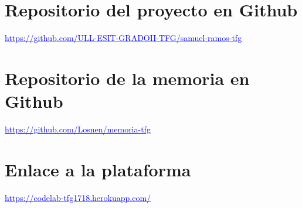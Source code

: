 \section{Repositorio del proyecto en Github}
\label{A:1}

\begin{center}
\textcolor{blue}{\underline{https://github.com/ULL-ESIT-GRADOII-TFG/samuel-ramos-tfg}}
\end{center}

\section{Repositorio de la memoria en Github}
\label{A:2}

\begin{center}
\textcolor{blue}{\underline{https://github.com/Losnen/memoria-tfg}}
\end{center}

\section{Enlace a la plataforma}
\label{A:3}

\begin{center}
\textcolor{blue}{\underline{https://codelab-tfg1718.herokuapp.com/}}
\end{center}
